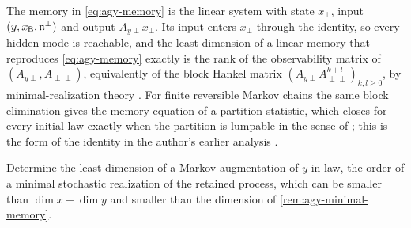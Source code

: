 \begin{remark}\label{rem:agy-minimal-memory}
The memory in \eqref{eq:agy-memory} is the linear system with state $x_\perp$, input $(y,x_{\mathsf{B}},\mathfrak n^\perp)$ and output $A_{y\perp}x_\perp$. Its input enters $x_\perp$ through the identity, so every hidden mode is reachable, and the least dimension of a linear memory that reproduces \eqref{eq:agy-memory} exactly is the rank of the observability matrix of $(A_{y\perp},A_{\perp\perp})$, equivalently of the block Hankel matrix $(A_{y\perp}A_{\perp\perp}^{k+l})_{k,l\ge0}$, by minimal-realization theory \citep{ho1966effective}. For finite reversible Markov chains the same block elimination gives the memory equation of a partition statistic, which closes for every initial law exactly when the partition is lumpable in the sense of \citet{kemeny1960finite}; this is the form of the identity in the author's earlier analysis \citep{dennis2026participatory}.
\end{remark}

\begin{openproblem}\label{open:agy-realization}
Determine the least dimension of a Markov augmentation of $y$ in law, the order of a minimal stochastic realization of the retained process, which can be smaller than $\dim x-\dim y$ and smaller than the dimension of \cref{rem:agy-minimal-memory}.
\end{openproblem}

